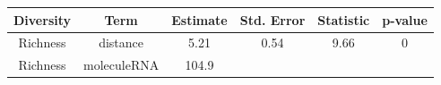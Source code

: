 \documentclass[]{article}
\begin{document}
\begin{longtable}[]{@{}cccccc@{}}
\toprule
\begin{minipage}[b]{0.12\columnwidth}\centering\strut
Diversity\strut
\end{minipage} & \begin{minipage}[b]{0.24\columnwidth}\centering\strut
Term\strut
\end{minipage} & \begin{minipage}[b]{0.11\columnwidth}\centering\strut
Estimate\strut
\end{minipage} & \begin{minipage}[b]{0.14\columnwidth}\centering\strut
Std. Error\strut
\end{minipage} & \begin{minipage}[b]{0.12\columnwidth}\centering\strut
Statistic\strut
\end{minipage} & \begin{minipage}[b]{0.09\columnwidth}\centering\strut
p-value\strut
\end{minipage}\tabularnewline
\midrule
\endhead
\begin{minipage}[t]{0.12\columnwidth}\centering\strut
Richness\strut
\end{minipage} & \begin{minipage}[t]{0.24\columnwidth}\centering\strut
distance\strut
\end{minipage} & \begin{minipage}[t]{0.11\columnwidth}\centering\strut
5.21\strut
\end{minipage} & \begin{minipage}[t]{0.14\columnwidth}\centering\strut
0.54\strut
\end{minipage} & \begin{minipage}[t]{0.12\columnwidth}\centering\strut
9.66\strut
\end{minipage} & \begin{minipage}[t]{0.09\columnwidth}\centering\strut
0\strut
\end{minipage}\tabularnewline
\begin{minipage}[t]{0.12\columnwidth}\centering\strut
Richness\strut
\end{minipage} & \begin{minipage}[t]{0.24\columnwidth}\centering\strut
moleculeRNA\strut
\end{minipage} & \begin{minipage}[t]{0.11\columnwidth}\centering\strut
104.9\strut
\end{minipage} & \begin{minipage}[t]{0.14\columnwidth}\centering\strut

\end{minipage}
\end{longtable}
\end{document}
